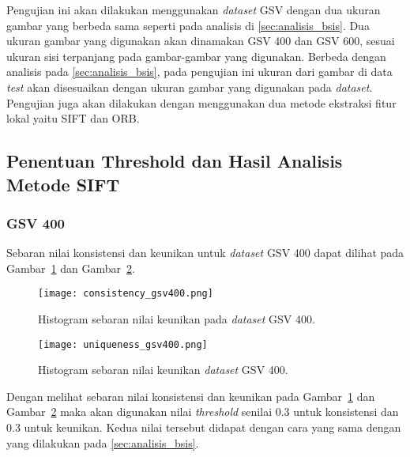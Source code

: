 Pengujian ini akan dilakukan menggunakan \textit{dataset} GSV dengan dua ukuran gambar yang berbeda sama seperti pada analisis di \ref{sec:analisis_bsis}. Dua ukuran gambar yang digunakan akan dinamakan GSV 400 dan GSV 600, sesuai ukuran sisi terpanjang pada gambar-gambar yang digunakan. Berbeda dengan analisis pada \ref{sec:analisis_bsis}, pada pengujian ini ukuran dari gambar di data \textit{test} akan disesuaikan dengan ukuran gambar yang digunakan pada \textit{dataset}. Pengujian juga akan dilakukan dengan menggunakan dua metode ekstraksi fitur lokal yaitu SIFT dan ORB.

\newpage
\subsection{Penentuan Threshold dan Hasil Analisis Metode SIFT}
\subsubsection{GSV 400}
Sebaran nilai konsistensi dan keunikan untuk \textit{dataset} GSV 400 dapat dilihat pada Gambar~\ref{fig:consistency_gsv400_pengujian_sift} dan Gambar~\ref{fig:uniqueness_gsv400_pengujian_sift}.
\begin{figure}[H]
	\centering
	\texttt{[image: consistency\_gsv400.png]}
	\caption{Histogram sebaran nilai keunikan pada \textit{dataset} GSV 400.}
	\label{fig:consistency_gsv400_pengujian_sift}
\end{figure}

\begin{figure}[H]
	\centering
	\texttt{[image: uniqueness\_gsv400.png]}
	\caption{Histogram sebaran nilai keunikan \textit{dataset} GSV 400.}
	\label{fig:uniqueness_gsv400_pengujian_sift}
\end{figure}
Dengan melihat sebaran nilai konsistensi dan keunikan pada Gambar~\ref{fig:consistency_gsv400_pengujian_sift} dan Gambar~\ref{fig:uniqueness_gsv400_pengujian_sift} maka akan digunakan nilai \textit{threshold} senilai 0.3 untuk konsistensi dan 0.3 untuk keunikan. Kedua nilai tersebut didapat dengan cara yang sama dengan yang dilakukan pada \ref{sec:analisis_bsis}. 

